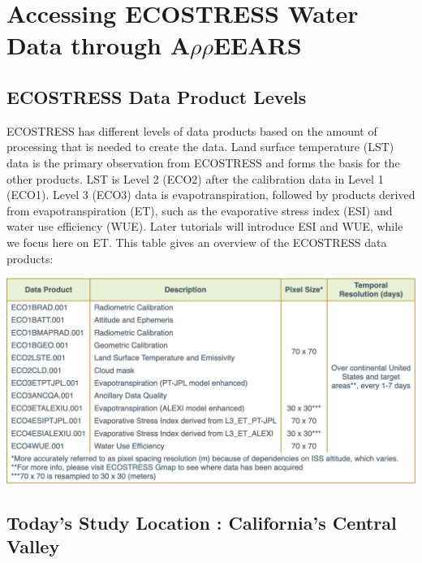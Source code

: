 \documentclass[oneside,a4paper,11pt,explicit]{book}
\begin{document}
\section{Accessing ECOSTRESS Water Data through A$\rho\rho$EEARS}

\subsection{ECOSTRESS Data Product Levels}

ECOSTRESS has different levels of data products based on the amount of processing that is needed to create the data. Land surface temperature (LST) data is the primary observation from ECOSTRESS and forms the basis for the other products. LST is Level 2 (ECO2) after the calibration data in Level 1 (ECO1). Level 3 (ECO3) data is evapotranspiration, followed by products derived from evapotranspiration (ET), such as the evaporative stress index (ESI) and water use efficiency (WUE). Later tutorials will introduce ESI and WUE, while we focus here on ET. This table gives an overview of the ECOSTRESS data products: 

\vspace{.5em}

\centerline{\includegraphics[width=.75\textwidth]{ECOSTRESS_DataProducts.png}}

\vspace{.5em}

\subsection{Today's Study Location : California's Central Valley}
\end{document}
